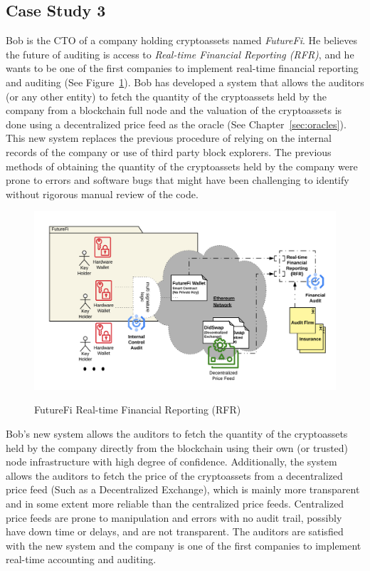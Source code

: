 \subsection{Case Study 3} \label{sec:auditing:case-studies:valuation} %
Bob is the CTO of a company holding cryptoassets named \textit{FutureFi}. He believes the future of auditing is access to \textit{Real-time Financial Reporting (RFR)}, and he wants to be one of the first companies to implement real-time financial reporting and auditing (See Figure~\ref{fig:RFR}). Bob has developed a system that allows the auditors (or any other entity) to fetch the quantity of the cryptoassets held by the company from a blockchain full node and the valuation of the cryptoassets is done using a decentralized price feed as the oracle (See Chapter~\ref{sec:oracles}). This new system replaces the previous procedure of relying on the internal records of the company or use of third party block explorers. The previous methods of obtaining the quantity of the cryptoassets held by the company were prone to errors and software bugs that might have been challenging to identify without rigorous manual review of the code. 


\begin{figure}[h]
    \centering
{\caption[FutureFi Real-time Financial Reporting (RFR)]{FutureFi Real-time Financial Reporting (RFR)}\label{fig:RFR}}
{\includegraphics[width=1\textwidth]{figures/BlockchainAudit-FutureFi.png}}
\end{figure}


Bob's new system allows the auditors to fetch the quantity of the cryptoassets held by the company directly from the blockchain using their own (or trusted) node infrastructure with high degree of confidence. Additionally, the system allows the auditors to fetch the price of the cryptoassets from a decentralized price feed (Such as a Decentralized Exchange), which is mainly more transparent and in some extent more reliable than the centralized price feeds. Centralized price feeds are prone to manipulation and errors with no audit trail, possibly have down time or delays, and are not transparent. The auditors are satisfied with the new system and the company is one of the first companies to implement real-time accounting and auditing. 

